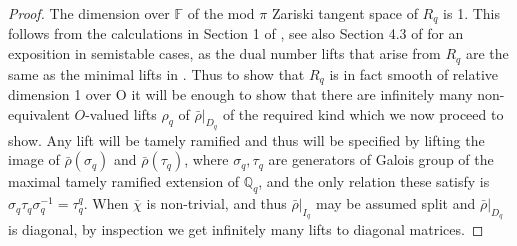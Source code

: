\documentclass[12pt]{amsart}
\newcommand{\Q}{\mathbb{Q}}
\newcommand{\rhobar}{\overline{\rho}}
\def\rhobar{ {\bar {\rho} } }
\newcommand{\F}{{\mathbb F}}
\begin{document}
\begin{proof}
The dimension over $\F$  of the mod $\pi$ Zariski tangent space of $R_q$ is 1. This follows from the calculations in Section 1 of \cite{Wiles}, 
see also Section 4.3 of \cite{deshalit} for an exposition in semistable cases, as the dual number lifts that arise from $R_q$ are the same as the minimal lifts in
\cite{Wiles}. Thus to show that $R_q$ is in fact smooth of relative 
dimension 1 over O it will be enough to show that there are infinitely many 
non-equivalent $O$-valued lifts $\rho_q$ of $\rhobar|_{D_q}$ 
of the required kind which we now proceed to show. 
Any lift will be tamely ramified and thus will be specified by lifting the image of $\rhobar(\sigma_q)$ 
and $\rhobar(\tau_q)$, where $\sigma_q,\tau_q$
are generators of Galois group of the maximal tamely ramified extension of $\Q_q$, and the 
only relation these satisfy  is $\sigma_q\tau_q\sigma_q^{-1}=\tau_q^q$. When $\overline \chi$ is non-trivial, 
and thus $\rhobar|_{I_q}$ may be assumed split and 
$\rhobar|_{D_q}$ is diagonal, 
by inspection we get infinitely many lifts to diagonal matrices. 


\end{proof}
\end{document}
